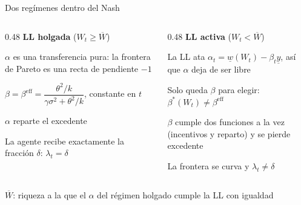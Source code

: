 \documentclass[12pt, aspectratio=169]{beamer}
\newenvironment{wideitemize}{\itemize\addtolength{\itemsep}{3pt}}{\enditemize}
\newcommand{\eff}{\text{eff}}
\begin{document}
\begin{frame}{Dos regímenes dentro del Nash}
    \begin{columns}[T]
        \begin{column}{0.48\textwidth}
            \textbf{LL holgada} ($W_t\ge\overline{W}$)
            \begin{wideitemize}
                \item $\alpha$ es una transferencia pura: la frontera de Pareto es una recta de pendiente $-1$
                \item $\beta=\beta^{\eff}=\dfrac{\theta^2/k}{\gamma\sigma^2+\theta^2/k}$, constante en $t$
                \item $\alpha$ reparte el excedente
                \item La agente recibe exactamente la fracción $\delta$: $\lambda_t=\delta$
            \end{wideitemize}
        \end{column}
        \begin{column}{0.48\textwidth}
            \textbf{LL activa} ($W_t<\overline{W}$)
            \begin{wideitemize}
                \item La LL ata $\alpha_t=\underline{w}(W_t)-\beta_t\underline{y}$, así que $\alpha$ deja de ser libre
                \item Solo queda $\beta$ para elegir: $\beta^*(W_t)\ne\beta^{\eff}$
                \item $\beta$ cumple dos funciones a la vez (incentivos y reparto) y se pierde excedente
                \item La frontera se curva y $\lambda_t\ne\delta$
            \end{wideitemize}
        \end{column}
    \end{columns}
    \vspace{0.3cm}
    \begin{center}
    {\footnotesize $\overline{W}$: riqueza a la que el $\alpha$ del régimen holgado cumple la LL con igualdad}
    \end{center}
\end{frame}
\end{document}

